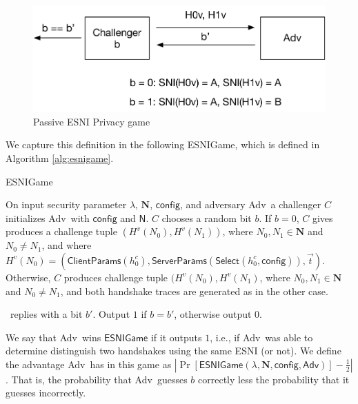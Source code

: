 \documentclass{article}
\newcommand{\adv}{{\sf Adv}}
\newcommand{\madv}{\mathsf{Adv}}
\begin{document}
\begin{figure}
    \centering
    \includegraphics[scale=0.7]{esni_game_passive.pdf}
    \caption{Passive ESNI Privacy game}
    \label{fig:passive-game}
\end{figure}

We capture this definition in the following {\sf ESNIGame}, which is defined in Algorithm \ref{alg:esnigame}.

\begin{algorithm}
\caption{{\sf ESNIGame}} 
\label{alg:esnigame}
\begin{algorithmic}[1]
  \STATE On input security parameter $\lambda$, $\mathbf{N}$, $\mathsf{config}$, and adversary \adv\, a challenger $C$ initializes \adv\ with 
  $\mathsf{config}$ and $\mathsf{N}$. 
  \STATE $C$ chooses a random bit $b$. If $b = 0$, $C$ gives produces a challenge tuple $(H^v(N_0), H^v(N_1))$, where $N_0,N_1 \in \mathbf{N}$ and $N_0 \not= N_1$, and where $H^v(N_0) = (\mathsf{ClientParams}(h^c_0), \mathsf{ServerParams}(\mathsf{Select}(h^c_0, \mathsf{config})), \vec{t})$.
  Otherwise, $C$ produces challenge tuple $(H^v(N_0), H^v(N_1)$, where $N_0,N_1 \in \mathbf{N}$ and $N_0 \not= N_1$, and both handshake traces are generated as in the other case.


  \STATE \adv\ replies with a bit $b'$.
  \STATE Output $1$ if $b = b'$, otherwise output $0$.
\end{algorithmic}
\end{algorithm}

We say that \adv\ wins $\mathsf{ESNIGame}$ if it outputs $1$, i.e., if \adv\ was able to determine distinguish 
two handshakes using the same ESNI (or not). We define the advantage \adv\ has in this game as
$|\Pr[\mathsf{ESNIGame}(\lambda, \mathbf{N}, \mathsf{config}, \madv)] - \frac{1}{2}|$. That is, 
the probability that \adv\ guesses $b$ correctly less the probability that it guesses incorrectly. 
\end{document}
